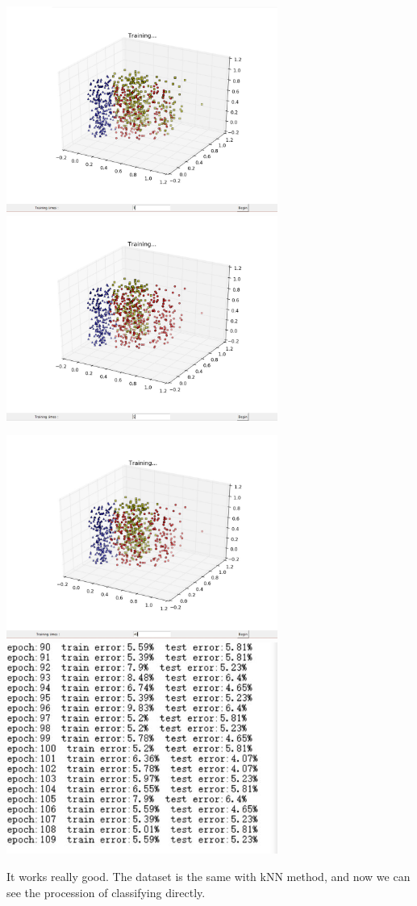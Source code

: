 \documentclass[12pt]{article}
\begin{document}
\includegraphics[width=3.5in]{09.jpg}
\includegraphics[width=3.5in]{10.jpg}

\includegraphics[width=3.5in]{11.jpg}
\includegraphics[width=3.5in]{12.jpg}

It works really good. The dataset is the same with kNN method, and now we can see the procession of classifying directly.






\end{document}
